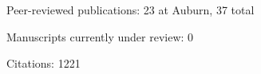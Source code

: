 \begin{veryTightItemize}
    \item Peer-reviewed publications: 23 at Auburn, 37 total
    \item Manuscripts currently under review: 0
    \item Citations: 1221
\end{veryTightItemize}
